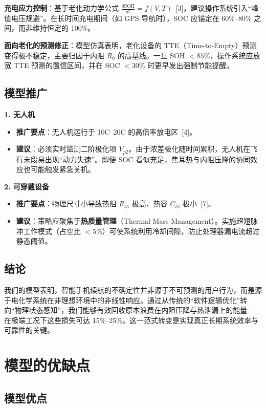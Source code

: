\documentclass[11pt,a4paper]{ctexart}
\begin{document}
\textbf{充电应力控制}：基于老化动力学公式 $\frac{d\mathrm{SOH}}{dt}=f(V,T)$~[3]，建议操作系统引入“峰值电压规避”。在长时间充电期间（如 GPS 导航时），SOC 应锚定在 60\%--80\% 之间，而非维持恒定的 100\%。

\textbf{面向老化的预测修正}：模型仿真表明，老化设备的 TTE（Time-to-Empty）预测变得极不稳定，主要归因于内阻 $R_0$ 的高基线。一旦 SOH $<85\%$，操作系统应放宽 TTE 预测的置信区间，并在 SOC $<30\%$ 时更早发出强制节能提醒。

\subsection{模型推广}

\textbf{1. 无人机}

\begin{itemize}
\item \textbf{推广要点}：无人机运行于 10C--20C 的高倍率放电区~[4]。
\item \textbf{建议}：必须实时监测二阶极化项 $V_{p2}$。由于浓差极化随时间累积，无人机在飞行末段易出现“动力失速”。即便 SOC 看似充足，焦耳热与内阻压降的协同效应也可能触发紧急关机。
\end{itemize}

\textbf{2. 可穿戴设备}

\begin{itemize}
\item \textbf{推广要点}：物理尺寸小导致热阻 $R_{th}$ 极高、热容 $C_{th}$ 极小~[7]。
\item \textbf{建议}：策略应聚焦于\textbf{热质量管理}（Thermal Mass Management）。实施超短脉冲工作模式（占空比 $<5\%$）可使系统利用冷却间隙，防止处理器漏电流超过静态阈值。
\end{itemize}

\subsection{结论}

我们的模型表明，智能手机续航的不确定性并非源于不可预测的用户行为，而是源于电化学系统在非理想环境中的非线性响应。通过从传统的“软件逻辑优化”转向“物理状态感知”，我们能够有效回收原本浪费在内阻压降与热泄漏上的能量——在极端工况下这些损失可达 15\%--25\%。这一范式转变是实现真正长期系统效率与可靠性的关键。

\section{模型的优缺点}

\subsection{模型优点}
\end{document}
